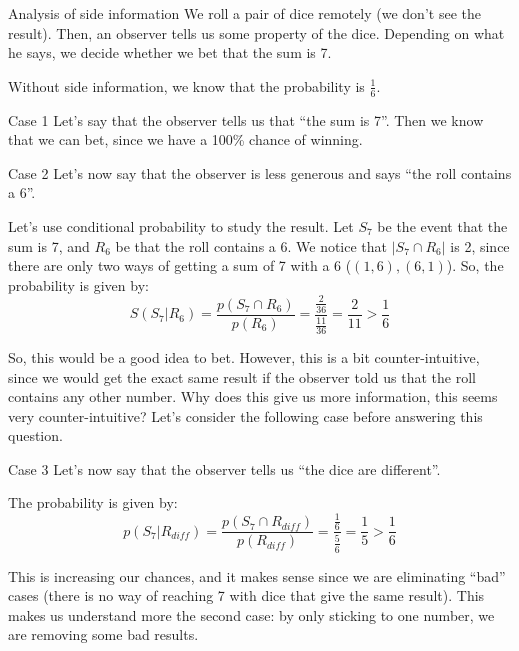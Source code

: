\documentclass[a4paper]{article}
\begin{document}
\begin{parag}{Analysis of side information}
    We roll a pair of dice remotely (we don't see the result). Then, an observer tells us some property of the dice. Depending on what he says, we decide whether we bet that the sum is 7.

    Without side information, we know that the probability is $\frac{1}{6}$.

    \begin{subparag}{Case 1}
        Let's say that the observer tells us that ``the sum is 7''. Then we know that we can bet, since we have a 100\% chance of winning.
    \end{subparag}

    \begin{subparag}{Case 2}
        Let's now say that the observer is less generous and says ``the roll contains a $6$''.

        Let's use conditional probability to study the result. Let $S_7$ be the event that the sum is 7, and $R_6$ be that the roll contains a 6. We notice that $\left|S_7 \cap R_6\right|$ is 2, since there are only two ways of getting a sum of 7 with a 6 ($\left(1, 6\right), \left(6, 1\right)$). So, the probability is given by: 
        \[S\left(S_7 | R_6\right) = \frac{p\left(S_7 \cap R_6\right)}{p\left(R_6\right)} = \frac{\frac{2}{36}}{\frac{11}{36}} = \frac{2}{11} > \frac{1}{6}\]

        So, this would be a good idea to bet. However, this is a bit counter-intuitive, since we would get the exact same result if the observer told us that the roll contains any other number. Why does this give us more information, this seems very counter-intuitive? Let's consider the following case before answering this question.
    \end{subparag}
    
    \begin{subparag}{Case 3}
        Let's now say that the observer tells us ``the dice are different''. 

        The probability is given by: 
        \[p\left(S_7 | R_{diff}\right) = \frac{p\left(S_7 \cap R_{diff}\right)}{p\left(R_{diff}\right)} = \frac{\frac{1}{6}}{\frac{5}{6}} = \frac{1}{5} > \frac{1}{6}\]

        This is increasing our chances, and it makes sense since we are eliminating ``bad'' cases (there is no way of reaching 7 with dice that give the same result). This makes us understand more the second case: by only sticking to one number, we are removing some bad results.
    \end{subparag}
\end{parag}
\end{document}
